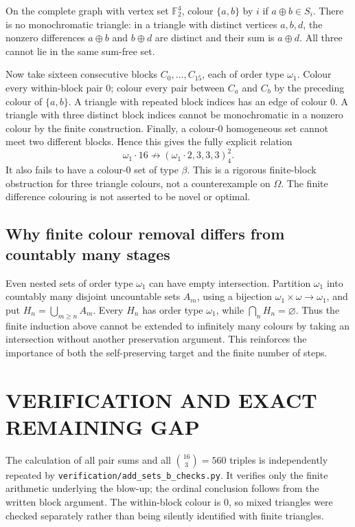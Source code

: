 On the complete graph with vertex set $\mathbb F_2^4$, colour $\{a,b\}$ by $i$ if $a\oplus b\in S_i$. There is no monochromatic triangle: in a triangle with distinct vertices $a,b,d$, the nonzero differences $a\oplus b$ and $b\oplus d$ are distinct and their sum is $a\oplus d$. All three cannot lie in the same sum-free set.

Now take sixteen consecutive blocks $C_0,\ldots,C_{15}$, each of order type $\omega_1$. Colour every within-block pair $0$; colour every pair between $C_a$ and $C_b$ by the preceding colour of $\{a,b\}$. A triangle with repeated block indices has an edge of colour $0$. A triangle with three distinct block indices cannot be monochromatic in a nonzero colour by the finite construction. Finally, a colour-$0$ homogeneous set cannot meet two different blocks. Hence this gives the fully explicit relation
\[
\omega_1\cdot16\not\longrightarrow
(\omega_1\cdot2,3,3,3)^2_4.
\]
It also fails to have a colour-$0$ set of type $\beta$. This is a rigorous finite-block obstruction for three triangle colours, not a counterexample on $\Omega$. The finite difference colouring is not asserted to be novel or optimal.

\subsection{Why finite colour removal differs from countably many stages}
Even nested sets of order type $\omega_1$ can have empty intersection. Partition $\omega_1$ into countably many disjoint uncountable sets $A_m$, using a bijection $\omega_1\times\omega\to\omega_1$, and put $H_n=\bigcup_{m\ge n}A_m$. Every $H_n$ has order type $\omega_1$, while $\bigcap_nH_n=\varnothing$. Thus the finite induction above cannot be extended to infinitely many colours by taking an intersection without another preservation argument. This reinforces the importance of both the self-preserving target and the finite number of steps.

\section{VERIFICATION AND EXACT REMAINING GAP}
The calculation of all pair sums and all $\binom{16}{3}=560$ triples is independently repeated by \texttt{verification/add\_sets\_b\_checks.py}. It verifies only the finite arithmetic underlying the blow-up; the ordinal conclusion follows from the written block argument. The within-block colour is $0$, so mixed triangles were checked separately rather than being silently identified with finite triangles.

